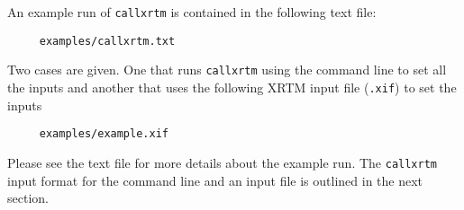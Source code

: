 \noindent
An example run of \texttt{callxrtm} is contained in the following text file:
\begin{verbatim}
     examples/callxrtm.txt
\end{verbatim}
Two cases are given.  One that runs \texttt{callxrtm} using the command line to set all the inputs and another that uses the following XRTM input file (\texttt{.xif}) to set the inputs
\begin{verbatim}
     examples/example.xif
\end{verbatim}
Please see the text file for more details about the example run.  The \texttt{callxrtm} input format for the command line and an input file is outlined in the next section.


\label{xrtm_utilities_stand_alone_execution_callxrtm_callxrtm_options}


\label{xrtm_utilities_stand_alone_execution_callxrtm_callxrtm_input_format}


%




%

%




